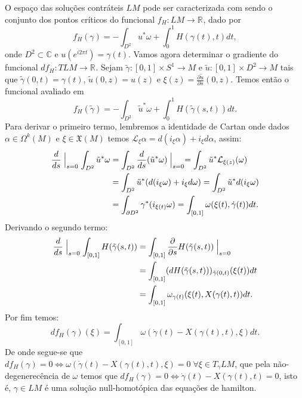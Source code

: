 \documentclass[12pt]{book}
\newcommand{\dparcial}[2]{\frac{\partial #1}{\partial #2}}
\newcommand{\real}[1]{\mathbb{R}^{#1}}
\begin{document}
	O espaço das soluções contráteis $LM$ pode ser caracterizada com sendo o conjunto dos pontos críticos do funcional $f_{H}:LM \to \real{}$, dado por
	$$
	f_{H}(\gamma) = -\int_{D^{2}}u^{*}\omega + \int_{0}^{1}H(\gamma(t), t)dt,
	$$
	onde $D^{2} \subset \mathbb{C}$ e $u(e^{i2\pi t}) = \gamma(t)$. Vamos agora determinar o gradiente do funcional $df_{H}: TLM \to \real{}$. Sejam $\tilde{\gamma}:[0,1] \times S^{1} \to M$  e $\tilde{u}:[0,1] \times D^{2} \to M$ tais que $\tilde{\gamma}(0,t) = \gamma(t)$, $\tilde{u}(0,z) = u(z)$ e $\xi(z) = \dparcial{\tilde{u}}{s}(0,z)$. Temos então o funcional avaliado em
	$$
	f_{H}(\tilde{\gamma}) = -\int_{D^{2}}\tilde{u}^{*}\omega + \int_{0}^{1}H(\tilde{\gamma}(s,t))dt.
	$$
	Para derivar o primeiro termo, lembremos a identidade de Cartan onde dados $\alpha \in \Omega^{k}(M)$ e $\xi \in \mathfrak{X}(M)$ temos $\mathcal{L}_{\xi}\alpha = d(i_{\xi}\alpha) + i_{\xi}d\alpha$, assim:
	$$
	\begin{aligned}
	\frac{d}{ds} \Bigm\lvert_{s=0} \int_{D^{2}}\tilde{u}^{*}\omega &=\int_{D^{2}}\frac{d}{ds} (\tilde{u}^{*}\omega)\Bigm\lvert_{s=0}  =\int_{D^{2}}\tilde{u}^{*} \mathcal{L}_{\xi(z)}(\omega)
	\\
	&=\int_{D^{2}}\tilde{u}^{*} (d(i_{\xi}\omega) + i_{\xi}d\omega) =\int_{D^{2}}\tilde{u}^{*} d(i_{\xi}\omega)
	\\
	&=\int_{\partial D^{2}}	\gamma^{*} (i_{\xi(t)}\omega) = \int_{[0,1]} \omega(\xi(t), \dot{\gamma}(t))dt.
	\end{aligned}
	$$
	Derivando o segundo termo:
	$$
	\begin{aligned}
	\frac{d}{ds} \Bigm\lvert_{s=0} \int_{[0,1]} H(\tilde{\gamma}(s,t)) 
	&= \int_{[0,1]} \dparcial{}{s} H(\tilde{\gamma}(s,t)) \Bigm\lvert_{s=0}
	\\
	&= \int_{[0,1]} (dH(\tilde{\gamma}(s,t)))_{\tilde{\gamma}(0,t)}(\xi(t))dt
	\\
	&= \int_{[0,1]} \omega_{\gamma(t)}(\xi(t), X(\gamma(t), t))dt. 
	\end{aligned}
	$$
	Por fim temos:
	$$
	df_{H}(\gamma)(\xi) = \int_{[0,1]} \omega(\dot{\gamma}(t) - X(\gamma(t), t), \xi)dt.
	$$
	De onde segue-se que $df_{H}(\gamma) = 0 \iff \omega(\dot{\gamma}(t) - X(\gamma(t), t), \xi)=0\; \forall \xi \in T_{\gamma}LM$, que pela não-degenerecência de $\omega$ temos que $df_{H}(\gamma) = 0 \iff \dot{\gamma}(t) - X(\gamma(t), t)=0$, isto é, $\gamma \in LM$ é uma solução null-homotópica das equações de hamilton.
\end{document}
